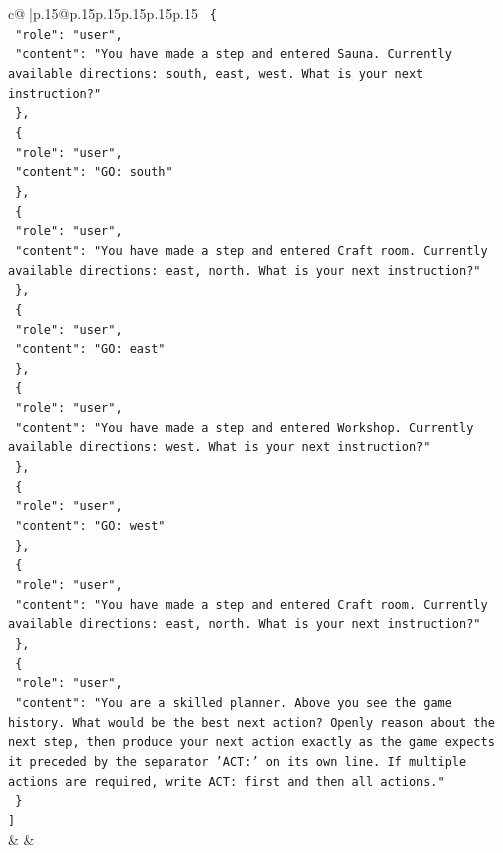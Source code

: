 \documentclass{article}
\begin{document}
{\begin{supertabular}{c@{$\;$}|p{.15\linewidth}@{}p{.15\linewidth}p{.15\linewidth}p{.15\linewidth}p{.15\linewidth}p{.15\linewidth}}
{{{\texttt{  \{} \\
\texttt{    "role": "user",} \\
\texttt{    "content": "You have made a step and entered Sauna. Currently available directions: south, east, west. What is your next instruction?"} \\
\texttt{  \},} \\
\texttt{  \{} \\
\texttt{    "role": "user",} \\
\texttt{    "content": "GO: south"} \\
\texttt{  \},} \\
\texttt{  \{} \\
\texttt{    "role": "user",} \\
\texttt{    "content": "You have made a step and entered Craft room. Currently available directions: east, north. What is your next instruction?"} \\
\texttt{  \},} \\
\texttt{  \{} \\
\texttt{    "role": "user",} \\
\texttt{    "content": "GO: east"} \\
\texttt{  \},} \\
\texttt{  \{} \\
\texttt{    "role": "user",} \\
\texttt{    "content": "You have made a step and entered Workshop. Currently available directions: west. What is your next instruction?"} \\
\texttt{  \},} \\
\texttt{  \{} \\
\texttt{    "role": "user",} \\
\texttt{    "content": "GO: west"} \\
\texttt{  \},} \\
\texttt{  \{} \\
\texttt{    "role": "user",} \\
\texttt{    "content": "You have made a step and entered Craft room. Currently available directions: east, north. What is your next instruction?"} \\
\texttt{  \},} \\
\texttt{  \{} \\
\texttt{    "role": "user",} \\
\texttt{    "content": "You are a skilled planner. Above you see the game history. What would be the best next action? Openly reason about the next step, then produce your next action exactly as the game expects it preceded by the separator 'ACT:' on its own line. If multiple actions are required, write ACT: first and then all actions."} \\
\texttt{  \}} \\
\texttt{{]}} \\
            }
        }
    }
    & & \\ \\


\end{supertabular}}
\end{document}
